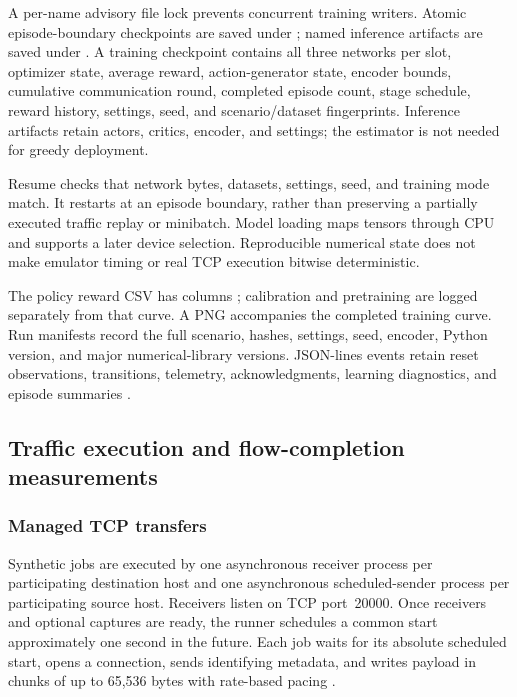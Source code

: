 \documentclass[11pt,a4paper]{article}
\newcommand{\code}[1]{\texttt{\detokenize{#1}}}
\begin{document}
A per-name advisory file lock prevents concurrent training writers. Atomic
episode-boundary checkpoints are saved under ;
named inference artifacts are saved under . A training checkpoint
contains all three networks per slot, optimizer state, average reward,
action-generator state, encoder bounds, cumulative communication round,
completed episode count, stage schedule, reward history, settings, seed, and
scenario/dataset fingerprints. Inference artifacts retain actors, critics,
encoder, and settings; the estimator is not needed for greedy deployment.

Resume checks that network bytes, datasets, settings, seed, and training mode
match. It restarts at an episode boundary, rather than preserving a partially
executed traffic replay or minibatch. Model loading maps tensors through CPU
and supports a later device selection. Reproducible numerical state does not
make emulator timing or real TCP execution bitwise deterministic.

The policy reward CSV has columns \code{episode,cumulative_reward}; calibration
and pretraining are logged separately from that curve. A PNG accompanies the
completed training curve. Run manifests record the full scenario, hashes,
settings, seed, encoder, Python version, and major numerical-library versions.
JSON-lines events retain reset observations, transitions, telemetry,
acknowledgments, learning diagnostics, and episode summaries
\cite{code-checkpoints,code-trials}.

\subsection{Traffic execution and flow-completion measurements}
\label{sec:fct}

\subsubsection{Managed TCP transfers}

Synthetic jobs are executed by one asynchronous receiver process per
participating destination host and one asynchronous scheduled-sender process
per participating source host. Receivers listen on TCP port~20000. Once
receivers and optional captures are ready, the runner schedules a common
start approximately one second in the future. Each job waits for its absolute
scheduled start, opens a connection, sends identifying metadata, and writes
payload in chunks of up to 65,536 bytes with rate-based pacing
\cite{code-runtime}.
\end{document}
